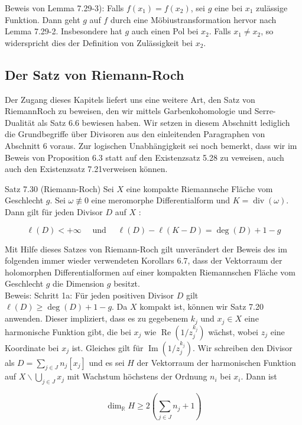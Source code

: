 \documentclass[10pt, letterpaper]{article}
\begin{document}
Beweis von Lemma 7.29-3): Falls $f\left(x_{1}\right)=f\left(x_{2}\right)$, sei $g$ eine bei $x_{1}$ zulässige Funktion. Dann geht $g$ auf $f$ durch eine Möbiustransformation hervor nach Lemma 7.29-2. Insbesondere hat $g$ auch einen Pol bei $x_{2}$. Falls $x_{1} \neq x_{2}$, so widerspricht dies der Definition von Zulässigkeit bei $x_{2}$.

\subsection {Der Satz von Riemann-Roch}
Der Zugang dieses Kapitels liefert uns eine weitere Art, den Satz von RiemannRoch zu beweisen, den wir mittels Garbenkohomologie und Serre-Dualität als Satz 6.6 bewiesen haben. Wir setzen in diesem Abschnitt lediglich die Grundbegriffe über Divisoren aus den einleitenden Paragraphen von Abschnitt 6 voraus. Zur logischen Unabhängigkeit sei noch bemerkt, dass wir im Beweis von Proposition 6.3 statt auf den Existenzsatz 5.28 zu veweisen, auch auch den Existenzsatz 7.21verweisen können.

Satz 7.30 (Riemann-Roch) Sei $X$ eine kompakte Riemannsche Fläche vom Geschlecht $g$. Sei $\omega \not \equiv 0$ eine meromorphe Differentialform und $K=\operatorname{div}(\omega)$. Dann gilt für jeden Divisor $D$ auf $X$ :

$$
\ell(D)<+\infty \quad \text { und } \quad \ell(D)-\ell(K-D)=\operatorname{deg}(D)+1-g
$$

Mit Hilfe dieses Satzes von Riemann-Roch gilt unverändert der Beweis des im folgenden immer wieder verwendeten Korollars 6.7, dass der Vektorraum der holomorphen Differentialformen auf einer kompakten Riemannschen Fläche vom Geschlecht $g$ die Dimension $g$ besitzt.\\
Beweis: Schritt 1a: Für jeden positiven Divisor $D$ gilt $\ell(D) \geqslant \operatorname{deg}(D)+1-g$. Da $X$ kompakt ist, können wir Satz 7.20 anwenden. Dieser impliziert, dass es zu gegebenem $k_{j}$ und $x_{j} \in X$ eine harmonische Funktion gibt, die bei $x_{j}$ wie $\operatorname{Re}\left(1 / z_{j}^{k_{j}}\right)$ wächst, wobei $z_{j}$ eine Koordinate bei $x_{j}$ ist. Gleiches gilt für $\operatorname{Im}\left(1 / z_{j}^{k_{j}}\right)$. Wir schreiben den Divisor als $D=\sum_{j \in J} n_{j}\left[x_{j}\right]$ und es sei $H$ der Vektorraum der harmonischen Funktion auf $X \backslash \bigcup_{j \in J} x_{j}$ mit Wachstum höchstens der Ordnung $n_{i}$ bei $x_{i}$. Dann ist

$$
\operatorname{dim}_{\mathbb{R}} H \geqslant 2\left(\sum_{j \in J} n_{j}+1\right)
$$
\end{document}
